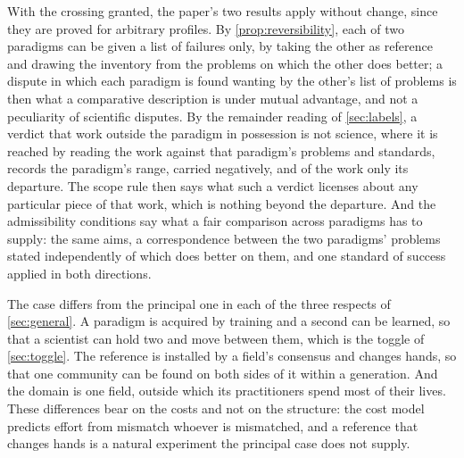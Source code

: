 With the crossing granted, the paper's two results apply without change, since they are proved for arbitrary profiles. By \autoref{prop:reversibility}, each of two paradigms can be given a list of failures only, by taking the other as reference and drawing the inventory from the problems on which the other does better; a dispute in which each paradigm is found wanting by the other's list of problems is then what a comparative description is under mutual advantage, and not a peculiarity of scientific disputes. By the remainder reading of \autoref{sec:labels}, a verdict that work outside the paradigm in possession is not science, where it is reached by reading the work against that paradigm's problems and standards, records the paradigm's range, carried negatively, and of the work only its departure. The scope rule then says what such a verdict licenses about any particular piece of that work, which is nothing beyond the departure. And the admissibility conditions say what a fair comparison across paradigms has to supply: the same aims, a correspondence between the two paradigms' problems stated independently of which does better on them, and one standard of success applied in both directions.

The case differs from the principal one in each of the three respects of \autoref{sec:general}. A paradigm is acquired by training and a second can be learned, so that a scientist can hold two and move between them, which is the toggle of \autoref{sec:toggle}. The reference is installed by a field's consensus and changes hands, so that one community can be found on both sides of it within a generation. And the domain is one field, outside which its practitioners spend most of their lives. These differences bear on the costs and not on the structure: the cost model predicts effort from mismatch whoever is mismatched, and a reference that changes hands is a natural experiment the principal case does not supply.

